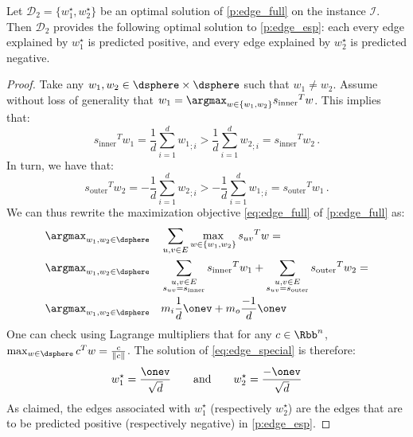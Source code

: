 \begin{prop}
  Let $\mathcal{D}_2 = \{w_1^\star, w_2^\star\}$ be an optimal solution of \autoref{p:edge_full} on the
  instance $\mathcal{I}$. Then $\mathcal{D}_2$ provides the following optimal solution to
  \autoref{p:edge_esp}: each every edge explained by $w_1^\star$ is predicted positive, and every
  edge explained by $w_2^\star$ is predicted negative.
\end{prop}
\begin{proof}
  Take any $w_1, w_2 \in \dsphere \times \dsphere$ such that $w_1 \neq w_2$. Assume without loss of
  generality that $w_1 = \argmax_{w\in \{w_1, w_2\}} {s_{\mathrm{inner}}}^T w$. This implies that:
  \begin{equation*}
    {s_{\mathrm{inner}}}^T w_1 = \frac{1}{d}\sum_{i=1}^d {w_1}_{;i} >
    \frac{1}{d}\sum_{i=1}^d {w_2}_{;i} = {s_{\mathrm{inner}}}^T w_2 \,.
  \end{equation*}
  In turn, we have that:
  \begin{equation*}
    {s_{\mathrm{outer}}}^T w_2 = -\frac{1}{d}\sum_{i=1}^d {w_2}_{;i} >
    -\frac{1}{d}\sum_{i=1}^d {w_1}_{;i} = {s_{\mathrm{outer}}}^T w_1 \,.
  \end{equation*}
  We can thus rewrite the maximization objective \eqref{eq:edge_full} of \autoref{p:edge_full} as:
  \begin{align}
    \label{eq:edge_special}
    \argmax_{w_1,w_2 \in \dsphere} & \quad \sum_{u,v \in E} \max_{w \in \{w_1, w_2\}} {s_{uv}}^T w = \\
    \argmax_{w_1,w_2 \in \dsphere} & \quad
    \sum_{\substack{u,v \in E\\ s_{uv} = s_{\mathrm{inner}}}} {s_{\mathrm{inner}}}^T w_1 +
    \sum_{\substack{u,v \in E\\ s_{uv} = s_{\mathrm{outer}}}} {s_{\mathrm{outer}}}^T w_2 = \notag \\
    \argmax_{w_1,w_2 \in \dsphere} & \quad m_i \frac{1}{d} \onev + m_o \frac{-1}{d} \onev \notag
  \end{align}
  One can check using Lagrange multipliers that for any $c \in \Rbb^n$, $\max_{w \in \dsphere} c^T w
  = \frac{c}{\|c\|}$. The solution of \eqref{eq:edge_special} is therefore:
  \begin{equation*}
    w_1^\star = \frac{\onev}{\sqrt{d}} \qquad \text{and} \qquad w_2^\star = \frac{-\onev}{\sqrt{d}}
  \end{equation*}
  As claimed, the edges associated with $w_1^\star$ (respectively $w_2^\star$) are the edges that
  are to be predicted positive (respectively negative) in \autoref{p:edge_esp}.
\end{proof}

